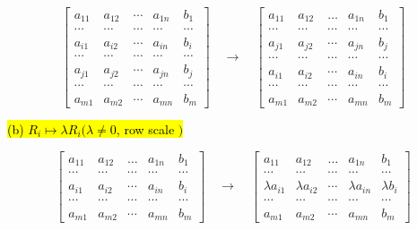 \documentclass[10pt]{article}
\begin{document}
\begin{enumerate}
$$
\left[\begin{array}{cccc|c}
a_{11} & a_{12} & \cdots & a_{1 n} & b_{1} \\
\cdots & \cdots & \cdots & \cdots & \cdots \\
a_{i 1} & a_{i 2} & \cdots & a_{i n} & b_{i} \\
\cdots & \cdots & \cdots & \cdots & \cdots \\
a_{j 1} & a_{j 2} & \cdots & a_{j n} & b_{j} \\
\cdots & \cdots & \cdots & \cdots & \cdots \\
a_{m 1} & a_{m 2} & \cdots & a_{m n} & b_{m}
\end{array}\right] \quad \longrightarrow \quad\left[\begin{array}{cccc|c}
a_{11} & a_{12} & \ldots & a_{1 n} & b_{1} \\
\cdots & \cdots & \cdots & \cdots & \cdots \\
a_{j 1} & a_{j 2} & \cdots & a_{j n} & b_{j} \\
\cdots & \cdots & \cdots & \cdots & \cdots \\
a_{i 1} & a_{i 2} & \cdots & a_{i n} & b_{i} \\
\cdots & \cdots & \cdots & \cdots & \cdots \\
a_{m 1} & a_{m 2} & \cdots & a_{m n} & b_{m}
\end{array}\right]
$$

\hl{(b) $R_{i} \mapsto \lambda R_{i}(\lambda \neq 0$, row scale $)$}

$$
\left[\begin{array}{cccc|c}
a_{11} & a_{12} & \ldots & a_{1 n} & b_{1} \\
\cdots & \cdots & \cdots & \cdots & \cdots \\
a_{i 1} & a_{i 2} & \cdots & a_{i n} & b_{i} \\
\cdots & \cdots & \cdots & \cdots & \cdots \\
a_{m 1} & a_{m 2} & \cdots & a_{m n} & b_{m}
\end{array}\right] \quad \longrightarrow \quad\left[\begin{array}{cccc|c}
a_{11} & a_{12} & \ldots & a_{1 n} & b_{1} \\
\cdots & \cdots & \cdots & \cdots & \cdots \\
\lambda a_{i 1} & \lambda a_{i 2} & \cdots & \lambda a_{i n} & \lambda b_{i} \\
\cdots & \cdots & \cdots & \cdots & \cdots \\
a_{m 1} & a_{m 2} & \cdots & a_{m n} & b_{m}
\end{array}\right]
$$


\end{enumerate}
\end{document}
